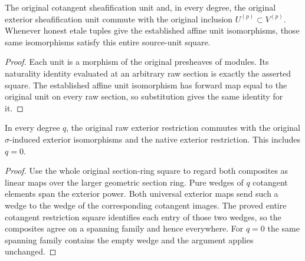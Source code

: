 \begin{lemma}
\label{lem:cartier-geometric-original-source-unit-restriction}
\leanok
{}
The original cotangent sheafification unit and, in every degree,
the original exterior sheafification unit commute with the
original inclusion $U^{(p)}\subset V^{(p)}$. Whenever honest etale
tuples give the established affine unit isomorphisms,
those same isomorphisms satisfy this entire source-unit square.
\end{lemma}
\begin{proof}
Each unit is a morphism of the original presheaves of modules.
Its naturality identity evaluated at an arbitrary raw section is
exactly the asserted square. The established affine unit
isomorphism has forward map equal to the original unit on every
raw section, so substitution gives the same identity for it.
\end{proof}

\begin{theorem}
\label{thm:cartier-geometric-raw-exterior-restriction}
\leanok
{}
In every degree $q$, the original raw exterior restriction commutes
with the original $\sigma$-induced exterior isomorphisms and the
native exterior restriction. This includes $q=0$.
\end{theorem}
\begin{proof}
Use the whole original section-ring square to regard both
composites as linear maps over the larger geometric section ring.
Pure wedges of $q$ cotangent elements span the exterior power.
Both universal exterior maps send such a wedge to the wedge of
the corresponding cotangent images. The proved entire cotangent
restriction square identifies each entry of those two wedges,
so the composites agree on a spanning family and hence everywhere.
For $q=0$ the same spanning family contains the empty wedge and
the argument applies unchanged.
\end{proof}
